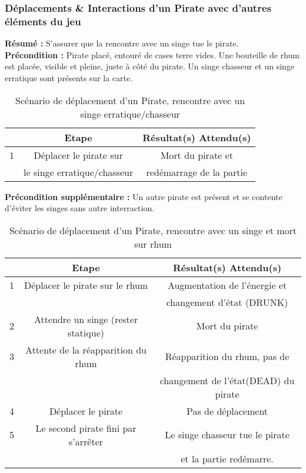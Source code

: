 \newpage
\subsubsection{Déplacements \& Interactions d'un Pirate avec d'autres éléments du jeu}
\textbf{Résumé :} S'assurer que la rencontre avec un singe tue le pirate.\\
\textbf{Précondition :} Pirate placé, entouré de cases terre vides. Une bouteille de rhum est placée, visible et pleine, juste à côté du pirate. Un singe chasseur et un singe erratique sont présents sur la carte.\\
\begin{table}[!h]
	\begin{center}
		\begin{tabular}{|p{6pt}|c|c|}
			\hline
			& \textbf{Etape} & \textbf{Résultat(s) Attendu(s)} \\\hline
			1 & Déplacer le pirate sur & Mort du pirate et\\
			 & le singe erratique/chasseur & redémarrage de la partie \\\hline
		\end{tabular}
	\end{center}
	\caption{Scénario de déplacement d'un Pirate, rencontre avec un singe erratique/chasseur}
\end{table}

\textbf{Précondition supplémentaire :} Un autre pirate est présent et se contente d'éviter les singes sans autre interraction.
\begin{table}[!h]
	\begin{center}
		\begin{tabular}{|p{6pt}|c|c|}
			\hline
			& \textbf{Etape} & \textbf{Résultat(s) Attendu(s)} \\\hline
			1 & Déplacer le pirate sur le rhum & Augmentation de l'énergie et\\
			 &  & changement d'état (DRUNK) \\\hline
			2 & Attendre un singe (rester statique) & Mort du pirate \\\hline
			3 & Attente de la réapparition du rhum & Réapparition du rhum, pas de\\
			 &  & changement de l'état(DEAD) du pirate \\\hline
			4 & Déplacer le pirate & Pas de déplacement \\\hline
			5 & Le second pirate fini par s'arrêter & Le singe chasseur tue le pirate \\
			 & & et la partie redémarre. \\\hline
		\end{tabular}
	\end{center}
	\caption{Scénario de déplacement d'un Pirate, rencontre avec un singe et mort sur rhum}
\end{table}

